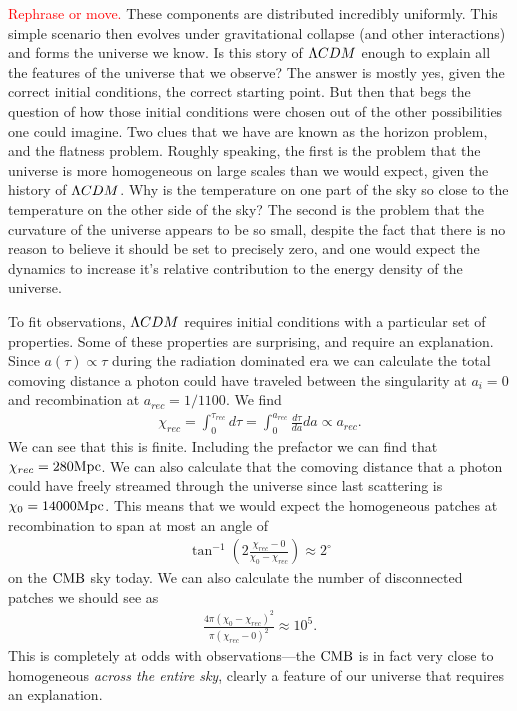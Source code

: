     \textcolor{red}{Rephrase or move.}
    These components are distributed incredibly uniformly. This simple scenario then evolves
    under gravitational collapse (and other interactions) and forms the universe we know.
    Is this story of $\Lambda CDM$ enough to explain all the features of the
    universe that we observe? The answer is mostly yes, given the correct initial conditions,
    the correct starting point. But then that begs the question of how those initial conditions
    were chosen out of the other possibilities one could imagine.
    Two clues that we have are known as the horizon problem, and the flatness problem.
    Roughly speaking, the first is the problem that the universe is more homogeneous on
    large scales than we would expect, given the history of $\Lambda CDM$. Why is the temperature on one
    part of the sky so close to the temperature on the other side of the sky?
    The second is the problem that the curvature of the universe appears to be so
    small, despite the fact that there is no reason to believe it should be set to precisely
    zero, and one would expect the dynamics to increase it's relative contribution to the
    energy density of the universe.


    To fit observations, $\Lambda CDM$ requires initial conditions with a particular set of properties.
    Some of these properties are surprising, and require an explanation.
    Since $a(\tau)\propto \tau$ during the radiation dominated era we can calculate
    the total comoving distance a photon could have traveled between the singularity at $a_i=0$
    and recombination at $a_{rec}=1/1100$. We find
    \begin{align}
        \chi_{rec} = \int_{0}^{\tau_{rec}} d \tau = \int_{0}^{a_{rec}} \frac{d\tau}{da}da \propto a_{rec}.
    \end{align}
    We can see that this is finite.
    Including the prefactor we can find that $\chi_{rec}=280\text{Mpc}$.
    We can also calculate that the comoving distance that a photon could have
    freely streamed through the universe since
    last scattering is $\chi_0=14000\text{Mpc}$.
    This means that we would expect the homogeneous patches at recombination to span
    at most an angle of
    \begin{align}
        \tan^{-1}\left(2\frac{\chi_{rec}-0}{\chi_{0}-\chi_{rec}}\right) \approx 2^{\circ}
    \end{align}
    on the $\text{CMB}$ sky today. We can also calculate the number of disconnected patches
    we should see as
    \begin{align}
        \frac{4\pi(\chi_{0}-\chi_{rec})^2}{\pi(\chi_{rec}-0)^2} \approx 10^5.
    \end{align}
    This is completely at odds with observations---the $\text{CMB}$ is in fact very close to
    homogeneous \textit{across the entire sky}, clearly a feature of our universe
    that requires an explanation.


